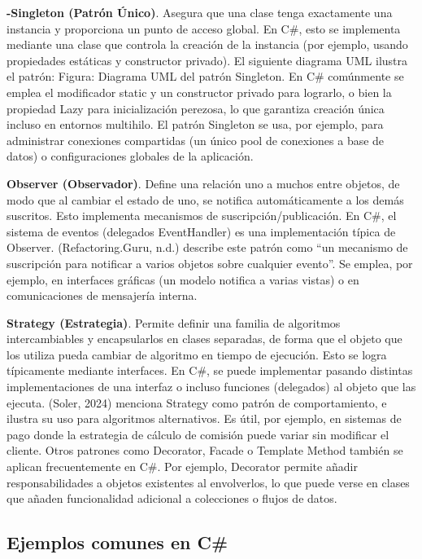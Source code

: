 \documentclass[
  11pt,
  letterpaper,
]{article}
\begin{document}
\textbf{-Singleton (Patrón Único)}. Asegura que una clase tenga
exactamente una instancia y proporciona un punto de acceso global. En
C\#, esto se implementa mediante una clase que controla la creación de
la instancia (por ejemplo, usando propiedades estáticas y constructor
privado). El siguiente diagrama UML ilustra el patrón: Figura: Diagrama
UML del patrón Singleton. En C\# comúnmente se emplea el modificador
static y un constructor privado para lograrlo, o bien la propiedad Lazy
para inicialización perezosa, lo que garantiza creación única incluso en
entornos multihilo. El patrón Singleton se usa, por ejemplo, para
administrar conexiones compartidas (un único pool de conexiones a base
de datos) o configuraciones globales de la aplicación.

\textbf{Observer (Observador)}. Define una relación uno a muchos entre
objetos, de modo que al cambiar el estado de uno, se notifica
automáticamente a los demás suscritos. Esto implementa mecanismos de
suscripción/publicación. En C\#, el sistema de eventos (delegados
EventHandler) es una implementación típica de Observer.
(Refactoring.Guru, n.d.) describe este patrón como ``un mecanismo de
suscripción para notificar a varios objetos sobre cualquier evento''. Se
emplea, por ejemplo, en interfaces gráficas (un modelo notifica a varias
vistas) o en comunicaciones de mensajería interna.

\textbf{Strategy (Estrategia)}. Permite definir una familia de
algoritmos intercambiables y encapsularlos en clases separadas, de forma
que el objeto que los utiliza pueda cambiar de algoritmo en tiempo de
ejecución. Esto se logra típicamente mediante interfaces. En C\#, se
puede implementar pasando distintas implementaciones de una interfaz o
incluso funciones (delegados) al objeto que las ejecuta. (Soler, 2024)
menciona Strategy como patrón de comportamiento, e ilustra su uso para
algoritmos alternativos. Es útil, por ejemplo, en sistemas de pago donde
la estrategia de cálculo de comisión puede variar sin modificar el
cliente. Otros patrones como Decorator, Facade o Template Method también
se aplican frecuentemente en C\#. Por ejemplo, Decorator permite añadir
responsabilidades a objetos existentes al envolverlos, lo que puede
verse en clases que añaden funcionalidad adicional a colecciones o
flujos de datos.

\subsection{Ejemplos comunes en C\#}\label{ejemplos-comunes-en-c}
\end{document}
